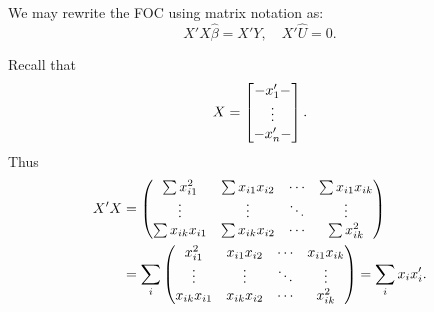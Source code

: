 \documentclass[letterpaper, 10pt]{article}
\begin{document}
We may rewrite the FOC using matrix notation as:
\[
  X'X \hat{\beta} = X' Y, \quad
  X' \hat{U} = 0.
\]
\begin{remark}
  Recall that
  \[
    X = \begin{bmatrix}
      - x_1' - \\
      \vdots \\
      - x_n' -
    \end{bmatrix}.
  \]
  Thus
  \begin{align*}
    X'X
    &= \begin{pmatrix}
      \sum x_{i1}^2 & \sum x_{i1} x_{i2} & \cdots & \sum x_{i1} x_{ik} \\
      \vdots & \vdots & \ddots & \vdots \\
      \sum x_{ik} x_{i1} & \sum x_{ik} x_{i2} & \cdots & \sum x_{ik}^2
    \end{pmatrix} \\
    &= \sum_i \begin{pmatrix}
      x_{i1}^2 & x_{i1} x_{i2} & \cdots & x_{i1} x_{ik} \\
      \vdots & \vdots & \ddots & \vdots \\
      x_{ik} x_{i1} & x_{ik} x_{i2} & \cdots & x_{ik}^2
    \end{pmatrix}
    = \sum_i x_i x_i'.
  \end{align*}
\end{remark}
\end{document}
